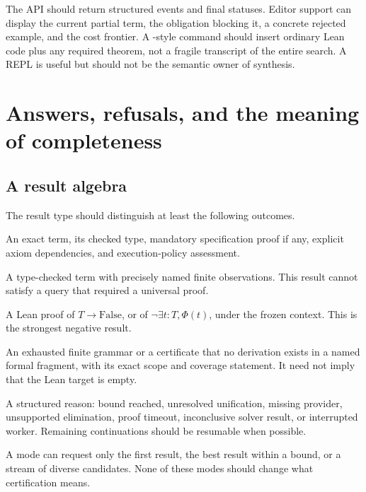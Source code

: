 The API should return structured events and final statuses. Editor support can display the current partial term, the obligation blocking it, a concrete rejected example, and the cost frontier. A -style command should insert ordinary Lean code plus any required theorem, not a fragile transcript of the entire search. A REPL is useful but should not be the semantic owner of synthesis.

\section{Answers, refusals, and the meaning of completeness}
\label{sec:answers}

\subsection{A result algebra}

The result type should distinguish at least the following outcomes.

\begin{description}[style=nextline,leftmargin=1.4em]
\item[Certified candidate]
An exact term, its checked type, mandatory specification proof if any, explicit axiom dependencies, and execution-policy assessment.
\item[Observed candidate]
A type-checked term with precisely named finite observations. This result cannot satisfy a query that required a universal proof.
\item[Certified empty]
A Lean proof of $T\to\mathrm{False}$, or of $\neg\exists t:T,\Phi(t)$, under the frozen context. This is the strongest negative result.
\item[Grammar or fragment exhausted]
An exhausted finite grammar or a certificate that no derivation exists in a named formal fragment, with its exact scope and coverage statement. It need not imply that the Lean target is empty.
\item[Unknown]
A structured reason: bound reached, unresolved unification, missing provider, unsupported elimination, proof timeout, inconclusive solver result, or interrupted worker. Remaining continuations should be resumable when possible.
\end{description}

A mode can request only the first result, the best result within a bound, or a stream of diverse candidates. None of these modes should change what certification means.

